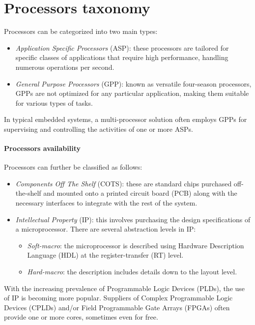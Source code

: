 \section{Processors taxonomy}

Processors can be categorized into two main types:
\begin{itemize}
    \item \textit{Application Specific Processors} (ASP): these processors are tailored for specific classes of applications that require high performance, handling numerous operations per second.
    \item \textit{General Purpose Processors} (GPP): known as versatile four-season processors, GPPs are not optimized for any particular application, making them suitable for various types of tasks.
\end{itemize}
In typical embedded systems, a multi-processor solution often employs GPPs for supervising and controlling the activities of one or more ASPs.

\paragraph*{Processors availability}
Processors can further be classified as follows:
\begin{itemize}
    \item \textit{Components Off The Shelf} (COTS): these are standard chips purchased off-the-shelf and mounted onto a printed circuit board (PCB) along with the necessary interfaces to integrate with the rest of the system.
    \item \textit{Intellectual Property} (IP): this involves purchasing the design specifications of a microprocessor. 
        There are several abstraction levels in IP:
        \begin{itemize}
            \item \textit{Soft-macro}: the microprocessor is described using Hardware Description Language (HDL) at the register-transfer (RT) level.
            \item \textit{Hard-macro}: the description includes details down to the layout level.
        \end{itemize} 
\end{itemize}
With the increasing prevalence of Programmable Logic Devices (PLDs), the use of IP is becoming more popular.
Suppliers of Complex Programmable Logic Devices (CPLDs) and/or Field Programmable Gate Arrays (FPGAs) often provide one or more cores, sometimes even for free.

